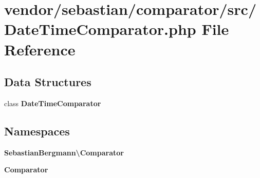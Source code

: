 \section{vendor/sebastian/comparator/src/\+Date\+Time\+Comparator.php File Reference}
\label{_date_time_comparator_8php}
\subsection*{Data Structures}
\begin{DoxyCompactItemize}
\item 
class {\bf Date\+Time\+Comparator}
\end{DoxyCompactItemize}
\subsection*{Namespaces}
\begin{DoxyCompactItemize}
\item 
 {\bf Sebastian\+Bergmann\textbackslash{}\+Comparator}
\item 
 {\bf Comparator}
\end{DoxyCompactItemize}
